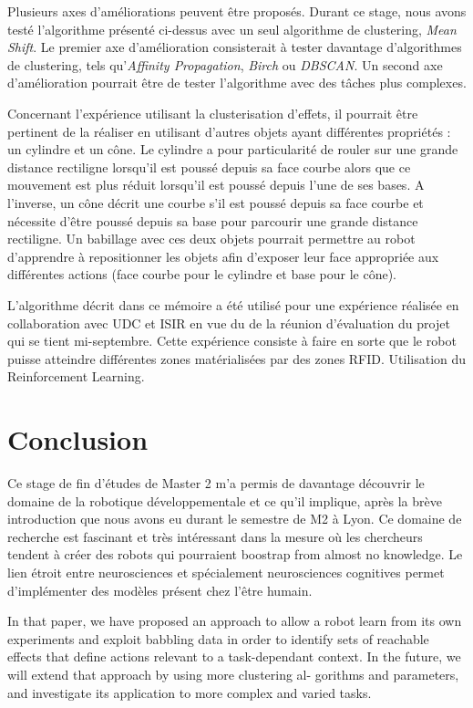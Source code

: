 \documentclass{llncs}
\begin{document}
Plusieurs axes d'améliorations peuvent être proposés. Durant ce stage, nous avons testé l'algorithme présenté ci-dessus avec un seul algorithme de clustering, \textit{Mean Shift}. Le premier axe d'amélioration consisterait à tester davantage d'algorithmes de clustering, tels qu'\textit{Affinity Propagation}, \textit{Birch} ou \textit{DBSCAN}. Un second axe d'amélioration pourrait être de tester l'algorithme avec des tâches plus complexes.

Concernant l'expérience utilisant la clusterisation d'effets, il pourrait être pertinent de la réaliser en utilisant d'autres objets ayant différentes propriétés : un cylindre et un cône. Le cylindre a pour particularité de rouler sur une grande distance rectiligne lorsqu'il est poussé depuis sa face courbe alors que ce mouvement est plus réduit lorsqu'il est poussé depuis l'une de ses bases. A l'inverse, un cône décrit une courbe s'il est poussé depuis sa face courbe et nécessite d'être poussé depuis sa base pour parcourir une grande distance rectiligne. Un babillage avec ces deux objets pourrait permettre au robot d'apprendre à repositionner les objets afin d'exposer leur face appropriée aux différentes actions (face courbe pour le cylindre et base pour le cône).

L'algorithme décrit dans ce mémoire a été utilisé pour une expérience réalisée en collaboration avec UDC et ISIR en vue du de la réunion d'évaluation du projet qui se tient mi-septembre. Cette expérience consiste à faire en sorte que le robot puisse atteindre différentes zones matérialisées par des zones RFID. Utilisation du Reinforcement Learning.






\section{Conclusion}

Ce stage de fin d'études de Master 2 m'a permis de davantage découvrir le domaine de la robotique développementale et ce qu'il implique, après la brève introduction que nous avons eu durant le semestre de M2 à Lyon. Ce domaine de recherche est fascinant et très intéressant dans la mesure où les chercheurs tendent à créer des robots qui pourraient boostrap from almost no knowledge. Le lien étroit entre neurosciences et spécialement neurosciences cognitives permet d'implémenter des modèles présent chez l'être humain.

In that paper, we have proposed an approach to allow a robot learn from its own experiments and exploit babbling data in order to identify sets of reachable effects that define actions relevant to a task-dependant context. In the future, we will extend that approach by using more clustering al- gorithms and parameters, and investigate its application to more complex and varied tasks.
\end{document}
